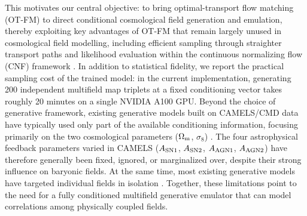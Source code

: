 \documentclass[usenatbib]{mnras}
\newcommand{\Om}{\Omega_{\rm m}}
\newcommand{\sig}{\sigma_8}
\begin{document}
This motivates our central objective: to bring optimal-transport flow
matching (OT-FM) to direct conditional cosmological field generation
and emulation, thereby exploiting key advantages of OT-FM that remain
largely unused in cosmological field modelling, including efficient
sampling through straighter transport paths and likelihood evaluation
within the continuous normalizing flow (CNF) framework \citep{Chen2018}.
In addition to statistical fidelity, we report the practical sampling
cost of the trained model: in the current implementation, generating
200 independent multifield map triplets at a fixed conditioning vector
takes roughly 20 minutes on a single NVIDIA A100 GPU.
Beyond the choice of generative framework, existing generative models
built on CAMELS/CMD data have typically used only part of the available
conditioning information, focusing primarily on the two cosmological
parameters ($\Om$, $\sig$)
\citep{Andrianomena2022,Andrianomena2024,Mudur2022DDPM,Hassan2023HIDM,Mudur2024,Mudur2024DiffHMC}.
The four astrophysical feedback parameters varied in CAMELS
($A_{\rm SN1}$, $A_{\rm SN2}$, $A_{\rm AGN1}$, $A_{\rm AGN2}$) have
therefore generally been fixed, ignored, or marginalized over, despite
their strong influence on baryonic fields. At the same time, most
existing generative models have targeted individual fields in isolation
\citep{Hassan2021HIFlow,Mudur2022DDPM,Hassan2023HIDM,Mudur2024}.
Together, these limitations point to the need for a fully conditioned
multifield generative emulator that can model correlations among
physically coupled fields.
\end{document}
